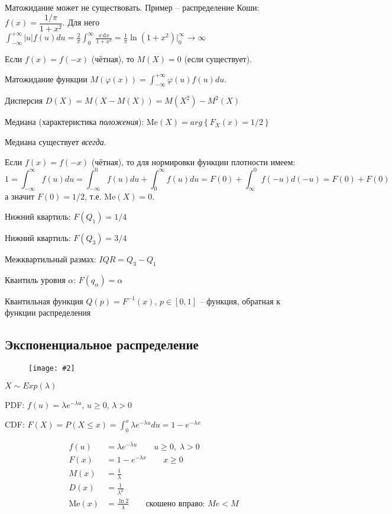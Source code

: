 \documentclass[a4paper,12pt]{article}
\numberwithin{figure}{section}
\newcommand\cfigure[2]{
	\begin{figure}[H] \centering \texttt{[image: \#2]} \end{figure}
}
\theoremstyle{definition}
\let\DS\displaystyle
\let\phi\varphi
\let\leqs\leqslant
\let\geqs\geqslant
\begin{document}
Матожидание может не существовать.
Пример -- распределение Коши: $f(x)=\dfrac{1/\pi}{1+x^2}$.
Для него $\DS \int_{-\infty}^{+\infty}|u|f(u)du
            = \frac2\pi \int_0^\infty \frac{x\,\mathrm{d}x}{1+x^2}
            = \frac1\pi \ln(1+x^2) \Big\rvert_0^\infty \to \infty$

Если $f(x)=f(-x)$ (чётная), то $M(X)=0$ (если существует).

\medskip

Матожидание функции
$\DS M\left( \phi(x) \right) = \int_{-\infty}^{+\infty}\phi(u)f(u)du$.

\medskip

Дисперсия $D(X) = M\left( X-M(X) \right) = M(X^2)-M^2(X)$

\bigskip

Медиана (характеристика \textit{положения}):
$\mathrm{Me}(X) = arg \left\{ F_X(x) = 1/2 \right\}$

Медиана существует \textit{всегда}.

Если $f(x)=f(-x)$ (чётная), то для нормировки функции плотности имеем:
\[ 1 = \int_{-\infty}^\infty f(u)du
     = \int_{-\infty}^0 f(u)du + \int_0^\infty f(u)du
     = F(0) + \int_\infty^0 f(-u)d(-u) = F(0) + F(0) \]
а значит $F(0)=1/2$, т.е. $\mathrm{Me}(X) = 0$.

\bigskip

Нижний квартиль: $F(Q_1) = 1/4$

Нижний квартиль: $F(Q_3) = 3/4$

Межквартильный размах: $IQR=Q_3-Q_1$

\medskip

Квантиль уровня $\alpha$: $F(q_{\alpha})=\alpha$

Квантильная функция $Q(p)=F^{-1}(x)$, $p\!\in\![0,1]$ --
функция, обратная к функции распределения


\subsection{Экспоненциальное распределение}

\cfigure{.9\linewidth}{exp-dist.png}

$X \sim Exp(\lambda)$

PDF: $\DS f(u) = \lambda e^{-\lambda u}$, $u\geqs0$, $\lambda>0$

CDF: $\DS F(X) = P(X\leqs x) = \int_0^x \lambda e^{-\lambda u} du = 1-e^{-\lambda x}$

\begin{align*}
	   f(u)&=\lambda e^{-\lambda u} \qquad u\geqs 0 ,\; \lambda>0
	\\ F(x)&=1-e^{-\lambda x} \qquad x\geqs 0
	\\ M(x)&=\frac{1}{\lambda}
	\\ D(x)&=\frac{1}{\lambda^2}
	\\ \mathrm{Me}(x)&=\frac{\ln 2}{\lambda} \qquad \text{скошено вправо: } Me<M
\end{align*}
\end{document}
